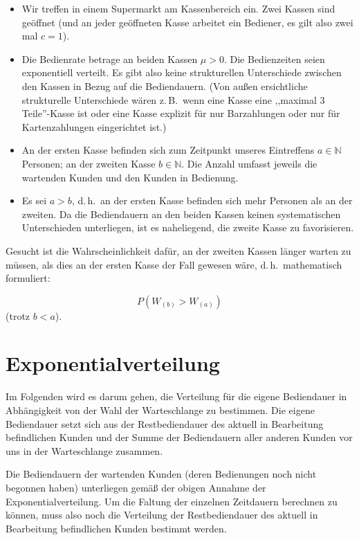 \documentclass[a4paper,11pt,oneside]{article}
\begin{document}
\begin{itemize}
\item
Wir treffen in einem Supermarkt am Kassenbereich ein. Zwei Kassen sind geöffnet (und an jeder geöffneten Kasse arbeitet ein Bediener, es gilt also zwei mal $c=1$).
\item
Die Bedienrate betrage an beiden Kassen $\mu>0$. Die Bedienzeiten seien exponentiell verteilt. Es gibt also keine strukturellen Unterschiede zwischen den Kassen in Bezug auf die Bediendauern. (Von außen ersichtliche strukturelle Unterschiede wären z.\,B.\ wenn eine Kasse eine ,,maximal 3 Teile''-Kasse ist oder eine Kasse explizit für nur Barzahlungen oder nur für Kartenzahlungen eingerichtet ist.)
\item
An der ersten Kasse befinden sich zum Zeitpunkt unseres Eintreffens $a\in\mathbb{N}$ Personen; an der zweiten Kasse $b\in\mathbb{N}$. Die Anzahl umfasst jeweils die wartenden Kunden und den Kunden in Bedienung.
\item
Es sei $a>b$, d.\,h.\ an der ersten Kasse befinden sich mehr Personen als an der zweiten. Da die Bediendauern an den beiden Kassen keinen systematischen Unterschieden unterliegen, ist es naheliegend, die zweite Kasse zu favorisieren.
\end{itemize}

Gesucht ist die Wahrscheinlichkeit dafür, an der zweiten Kassen länger warten zu müssen, als dies an der ersten Kasse der Fall gewesen wäre, d.\,h.\ mathematisch formuliert:

$$
P(W_{(b)}>W_{(a)})
$$
(trotz $b<a$).



\section{Exponentialverteilung}

Im Folgenden wird es darum gehen, die Verteilung für die eigene Bediendauer in Abhängigkeit von der Wahl der Warteschlange zu bestimmen. Die eigene Bediendauer setzt sich aus der Restbediendauer des aktuell in Bearbeitung befindlichen Kunden und der Summe der Bediendauern aller anderen Kunden vor uns in der Warteschlange zusammen.

Die Bediendauern der wartenden Kunden (deren Bedienungen noch nicht begonnen haben) unterliegen gemäß der obigen Annahme der Exponentialverteilung. Um die Faltung der einzelnen Zeitdauern berechnen zu können, muss also noch die Verteilung der Restbediendauer des aktuell in Bearbeitung befindlichen Kunden bestimmt werden.
\end{document}
